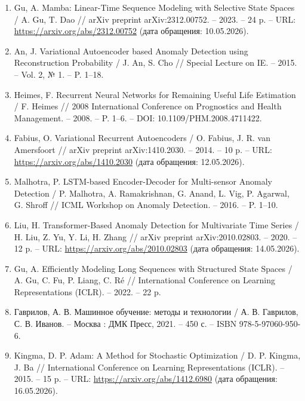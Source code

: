 \documentclass[14pt, a4paper, oneside]{extreport}
\begin{document}
\begin{enumerate}
\item Gu, A. Mamba: Linear-Time Sequence Modeling with Selective State Spaces / A. Gu, T. Dao // arXiv preprint arXiv:2312.00752. – 2023. – 24 p. – URL: \url{https://arxiv.org/abs/2312.00752} (дата обращения: 10.05.2026).

\item An, J. Variational Autoencoder based Anomaly Detection using Reconstruction Probability / J. An, S. Cho // Special Lecture on IE. – 2015. – Vol. 2, № 1. – P. 1–18.

\item Heimes, F. Recurrent Neural Networks for Remaining Useful Life Estimation / F. Heimes // 2008 International Conference on Prognostics and Health Management. – 2008. – P. 1–6. – DOI: 10.1109/PHM.2008.4711422.

\item Fabius, O. Variational Recurrent Autoencoders / O. Fabius, J. R. van Amersfoort // arXiv preprint arXiv:1410.2030. – 2014. – 10 p. – URL: \url{https://arxiv.org/abs/1410.2030} (дата обращения: 12.05.2026).

\item Malhotra, P. LSTM-based Encoder-Decoder for Multi-sensor Anomaly Detection / P. Malhotra, A. Ramakrishnan, G. Anand, L. Vig, P. Agarwal, G. Shroff // ICML Workshop on Anomaly Detection. – 2016. – P. 1–10.

\item Liu, H. Transformer-Based Anomaly Detection for Multivariate Time Series / H. Liu, Z. Yu, Y. Li, H. Zhang // arXiv preprint arXiv:2010.02803. – 2020. – 12 p. – URL: \url{https://arxiv.org/abs/2010.02803} (дата обращения: 14.05.2026).

\item Gu, A. Efficiently Modeling Long Sequences with Structured State Spaces / A. Gu, C. Fu, P. Liang, C. Ré // International Conference on Learning Representations (ICLR). – 2022. – 22 p.

\item Гаврилов, А. В. Машинное обучение: методы и технологии / А. В. Гаврилов, С. В. Иванов. – Москва : ДМК Пресс, 2021. – 450 с. – ISBN 978-5-97060-950-6.

\item Kingma, D. P. Adam: A Method for Stochastic Optimization / D. P. Kingma, J. Ba // International Conference on Learning Representations (ICLR). – 2015. – 15 p. – URL: \url{https://arxiv.org/abs/1412.6980} (дата обращения: 16.05.2026).


\end{enumerate}
\end{document}
